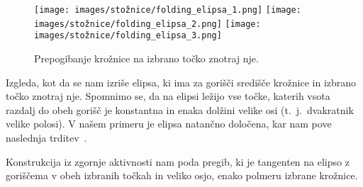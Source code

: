 \begin{figure}[h]
    \centering
    \texttt{[image: images/stožnice/folding\_elipsa\_1.png]}
    \texttt{[image: images/stožnice/folding\_elipsa\_2.png]}
    \texttt{[image: images/stožnice/folding\_elipsa\_3.png]}
    \caption[Prepogibanje elipse]{Prepogibanje krožnice na izbrano točko znotraj nje.}
    \label{fig:koraki_elipsa}
\end{figure}


Izgleda, kot da se nam izriše elipsa, ki ima za gorišči središče krožnice in izbrano točko znotraj nje. Spomnimo se, da na elipsi ležijo vse točke, katerih vsota razdalj do obeh gorišč je konstantna in enaka dolžini velike osi (t.~j.\ dvakratnik velike polosi). V našem primeru je elipsa natančno določena, kar nam pove naslednja trditev~\cite[str.\ 60--61]{hull2013}.

\begin{trditev}
    Konstrukcija iz zgornje aktivnosti nam poda pregib, ki je tangenten na elipso z goriščema v obeh izbranih točkah in veliko osjo, enako polmeru izbrane krožnice.
\end{trditev}

